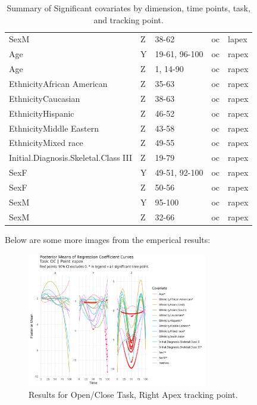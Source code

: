 \documentclass[AMA,Times1COL]{WileyNJDv5} %
\begin{document}
\begin{table}
{{\begin{tabular}[t]{lllll}
SexM & Z & 38-62 & oc & lapex\\
\addlinespace
Age & Y & 19-61, 96-100 & oc & rapex\\
Age & Z & 1, 14-90 & oc & rapex\\
EthnicityAfrican American & Z & 35-63 & oc & rapex\\
EthnicityCaucasian & Z & 38-63 & oc & rapex\\
EthnicityHispanic & Z & 46-52 & oc & rapex\\
\addlinespace
EthnicityMiddle Eastern & Z & 43-58 & oc & rapex\\
EthnicityMixed race & Z & 49-55 & oc & rapex\\
Initial.Diagnosis.Skeletal.Class III & Z & 19-79 & oc & rapex\\
SexF & Y & 49-51, 92-100 & oc & rapex\\
SexF & Z & 50-56 & oc & rapex\\
\addlinespace
SexM & Y & 95-100 & oc & rapex\\
SexM & Z & 32-66 & oc & rapex\\
\bottomrule
\end{tabular}}
}%
\caption{Summary of Significant covariates by dimension, time points, task, and tracking point.}
\label{tab:significant_covariates}
\end{table}

%
\vspace*{12pt}
Below are some more images from the emperical results:

\begin{figure}[h]
    \centering
    \includegraphics[width = 0.7\textwidth]{oc_rapex_plot.jpeg}
    \caption{Results for Open/Close Task, Right Apex tracking point.}
    \label{fig:oc_rapex}
\end{figure}
\end{document}

